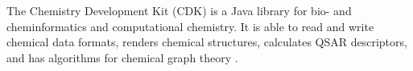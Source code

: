 The Chemistry Development Kit (CDK) is a Java library for bio- and cheminformatics and computational chemistry. It is able to read and write chemical data formats, renders chemical structures, calculates QSAR descriptors, and has algorithms for chemical graph theory \cite{Steinbeck_2003}\cite{Steinbeck_2006}. 